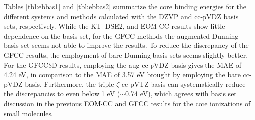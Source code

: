\documentclass[aps,prb,preprint,groupaddress,floatfix]{revtex4}
\begin{document}
Tables \ref{tbl:ebbas1} and \ref{tbl:ebbas2} summarize the core binding energies
for the different systems and methods calculated with the DZVP and cc-pVDZ basis
sets, respectively. While the KT, DSE2, and EOM-CC results show little
dependence on the basis set, for the GFCC methods the augmented Dunning basis
set seems not able to improve the results. To reduce the discrepancy of the GFCC
results, the employment of bare Dunning basis sets seems slightly better. For
the GFCCSD results, employing the aug-cc-pVDZ basis gives the MAE of 4.24 eV, in
comparison to the MAE of 3.57 eV brought by employing the bare cc-pVDZ basis.
Furthermore, the triple-$\zeta$ cc-pVTZ basis can systematically reduce the
discrepancies to even below 1 eV ($\sim$0.74 eV), which agrees with basis set
discussion in the previous EOM-CC and GFCC results for the core ionizations of
small molecules.\cite{mukherjee13_2625, sonia16_149901, peng18_4335}
\end{document}

